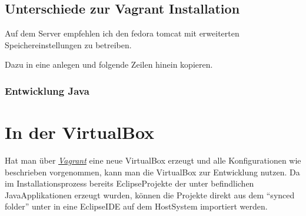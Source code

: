 \documentclass[letterpaper,10pt,english]{sphinxmanual}
\begin{document}
\subsection{Unterschiede zur Vagrant Installation}
\label{\detokenize{toscience:unterschiede-zur-vagrant-installation}}\label{\detokenize{toscience:id59}}
\sphinxAtStartPar
Auf dem Server empfehlen ich den fedora tomcat mit erweiterten
Speichereinstellungen zu betreiben.

\sphinxAtStartPar
Dazu in  eine  anlegen
und folgende Zeilen hinein kopieren.

\begin{sphinxVerbatim}[commandchars=\\\{\}]

 
\end{sphinxVerbatim}


\subsubsection{Entwicklung Java}
\label{\detokenize{toscience:entwicklung-java}}\label{\detokenize{toscience:id60}}

\section{In der VirtualBox}
\label{\detokenize{toscience:in-der-virtualbox}}\label{\detokenize{toscience:id61}}
\sphinxAtStartPar
Hat man über {\hyperref[\detokenize{toscience:_vagrant}]{\emph{Vagrant}}} eine neue VirtualBox erzeugt und
alle Konfigurationen wie beschrieben vorgenommen, kann man die
VirtualBox zur Entwicklung nutzen. Da im Installationsprozess bereits
Eclipse\sphinxhyphen{}Projekte der unter  befindlichen
Java\sphinxhyphen{}Applikationen erzeugt wurden, können die Projekte direkt aus dem
“synced folder” unter  in eine Eclipse\sphinxhyphen{}IDE auf dem
Host\sphinxhyphen{}System importiert werden.
\end{document}
